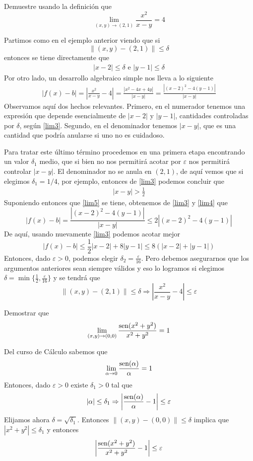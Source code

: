 \begin{ejemplo}
 Demuestre usando la definici\'on que
$$\lim_{(x,y)\to (2,1)}\frac{x^2}{x-y}=4$$
\begin{solucion}
Partimos como en el ejemplo anterior viendo que si 
$$
\|(x,y)-(2,1)\|\leq \delta
$$
entonces se tiene directamente que
\begin{gather}\label{lim3}
|x-2|\leq \delta \text{ e } |y-1|\leq \delta \tag{*}
\end{gather}
Por otro lado, un desarrollo algebraico simple nos lleva a lo siguiente
\begin{gather} \label{lim4}
|f(x)-b|=\left|\frac{x^2}{x-y}-4\right|=\frac{|x^2-4x+4y|}{|x-y|}=
\frac{|(x-2)^2-4(y-1)|}{|x-y|} \tag{**}
\end{gather}
Observamos aqu\'i dos hechos relevantes. Primero, en el numerador tenemos
una expresi\'on que depende esencialmente de $|x-2|$ y $|y-1|$, cantidades 
controladas por $\delta$, seg\'un \eqref{lim3}. Segundo, en el  denominador tenemos 
$|x-y|$, que es una cantidad que podr\'ia anularse si uno no es cuidadoso.

Para tratar este \'ultimo t\'ermino procedemos en una primera etapa encontrando un
valor $\delta_1$ medio, que si bien no nos permitir\'a acotar 
por $\varepsilon$ nos permitir\'a controlar $|x-y|$. El 
denominador no se anula en $(2,1)$,  de aqu\'i vemos que si elegimos
$\delta_1=1/4$, por ejemplo, entonces de \eqref{lim3} podemos concluir que 
\begin{gather}\label{lim5}
|x-y|>\frac{1}{2} \tag{***}
\end{gather}
Suponiendo entonces que \eqref{lim5} se tiene, obtenemos de \eqref{lim3} y \eqref{lim4}  que
$$
|f(x)-b|=
\frac{|(x-2)^2-4(y-1)|}{|x-y|}\leq 2
|(x-2)^2-4
(y-1)|$$
De aqu\'i, usando nuevamente \eqref{lim3} podemos acotar mejor
$$
|f(x)-b|\leq \frac{1}{2}|x-2|+8|y-1|\le 8(|x-2|+|y-1|)
$$ 
Entonces, dado $\varepsilon>0$, podemos elegir $\delta_2=\frac{\varepsilon}{16}.$
Pero debemos asegurarnos que los argumentos anteriores sean siempre v\'alidos
y eso lo logramos si elegimos 
$\delta=
\min\{\frac{1}{2},\frac{\varepsilon}{16}\}$ y se tendr\'a que 
$$\|(x,y)-(2,1)\|\leq \delta\Rightarrow \left|\frac{x^2}{x-y}-4\right|\leq \varepsilon$$
\end{solucion}
\end{ejemplo}

\begin{ejemplo}
Demostrar  que
$$\lim_{(x,y)\to (0,0)}\frac{\text{sen}(x^2+y^2)}{x^2+y^2}=1$$
\begin{solucion}
Del curso de C\'alculo sabemos que
$$\lim_{\alpha\to 0}\frac{\text{sen}(\alpha)}{\alpha}=1$$
Entonces, dado $\varepsilon>0$ existe $\delta_1>0$ tal que 
$$|\alpha|\leq \delta_1\Rightarrow \left|\frac{\text{sen}(\alpha)}{\alpha}-1\right|\leq \varepsilon
$$
Elijamos ahora $\delta=\sqrt{\delta_1}$. Entonces $\|(x,y)-(0,0)\|\leq \delta$ implica
que  $|x^2+y^2|\leq \delta_1$ y entonces
$$\left|\frac{\text{sen}(x^2+y^2)}{x^2+y^2}-1\right|\leq \varepsilon$$
\end{solucion}
\end{ejemplo}

